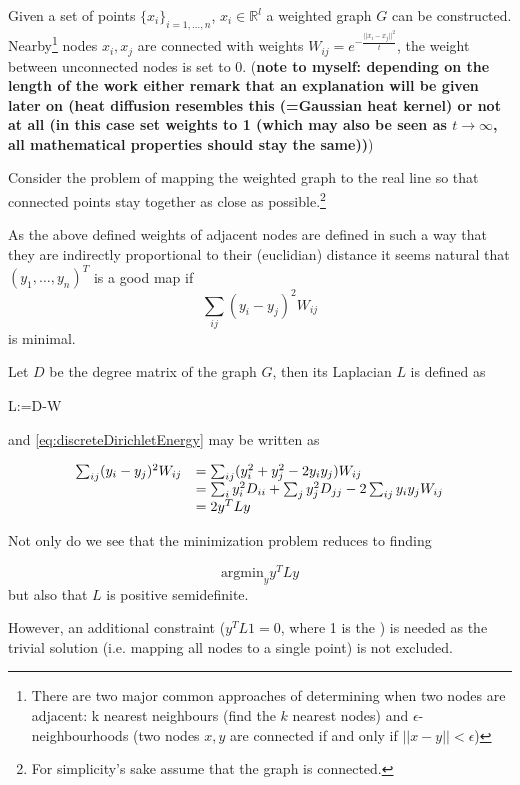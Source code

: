 Given a set of points $\{x_i\}_{i=1,\dots,n}$, $x_i \in \mathbb{R}^l$ a weighted graph $G$ can be constructed. Nearby\footnote{There are two major common approaches of determining when two nodes are adjacent: k nearest neighbours (find the $k$ nearest nodes) and $\epsilon$-neighbourhoods (two nodes $x,y$ are connected if and only if $||x-y||<\epsilon$)} nodes $x_i,x_j$ are connected with weights $W_{ij}=e^{-\frac{||x_i - x_j||^2}{t}}$, the weight between unconnected nodes is set to $0$. (\textbf{note to myself: depending on the length of the work either remark that an explanation will be given later on (heat diffusion resembles this (=Gaussian heat kernel) or not at all (in this case set weights to 1 (which may also be seen as $t\rightarrow \infty$, all mathematical properties should stay the same))})

Consider the problem of mapping the weighted graph to the real line so that connected points stay together as close as possible.\footnote{For simplicity's sake assume that the graph is connected.}

As the above defined weights of adjacent nodes are defined in such a way that they are indirectly proportional to their (euclidian) distance it seems natural that $(y_1,\dots,y_n)^T$ is a good map if
\begin{equation} \label{eq:discreteDirichletEnergy}
    \sum _{ij} (y_i - y_j)^2 W_{ij}
\end{equation}
is minimal.

Let $D$ be the degree matrix of the graph $G$, then its Laplacian $L$ is defined as
\begin{definition}
    L:=D-W
\end{definition}

and \eqref{eq:discreteDirichletEnergy} may be written as 

\begin{equation*}\begin{array}{l l}
\sum _{ij} (y_i - y_j)^2 W_{ij} &= \sum _{ij} (y_i^2 + y_j^2 - 2y_i y_j) W_{ij}\\
    &= \sum _{i} y_i^2 D_{ii} + \sum _{j} y_j^2 D_{jj} - 2\sum _{ij} y_i y_j W_{ij}\\
    &= 2y^TLy
\end{array}\end{equation*}

Not only do we see that the minimization problem reduces to finding

\begin{equation*}
    \text{argmin}_y y^TLy
\end{equation*}
but also that $L$ is positive semidefinite.

However, an additional constraint ($y^TL\text{1}=0$, where 1 is the ) is needed as the trivial solution (i.e. mapping all nodes to a single point) is not excluded.